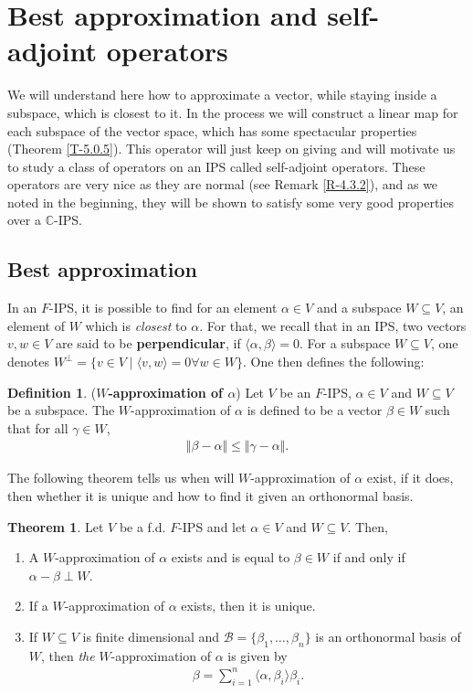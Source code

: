 \documentclass[letterpaper,11pt,twoside]{article}
\theoremstyle{definition}
\theoremstyle{definition}
\newtheorem{definition}[proposition]{Definition}
\newtheorem{theorem}[proposition]{Theorem}
\theoremstyle{definition}
\theoremstyle{definition}
\theoremstyle{definition}
\theoremstyle{definition}
\theoremstyle{remark}
\theoremstyle{definition}
\newcommand{\ip}[2]{\langle #1,#2 \rangle}
\newcommand{\norm}[1]{\Vert #1 \Vert}
\newcommand{\C}{\mathbb{C}}
\begin{document}
    \section{Best approximation and self-adjoint operators}
    We will understand here how to approximate a vector, while staying inside a subspace, which is closest to it. In the process we will construct a linear map for each subspace of the vector space, which has some spectacular properties (Theorem \ref{T-5.0.5}). This operator will just keep on giving and will motivate us to study a class of operators on an IPS called self-adjoint operators. These operators are very nice as they are normal (see Remark \ref{R-4.3.2}), and as we noted in the beginning, they will be shown to satisfy some very good properties over a $ \C $-IPS.
    \subsection{Best approximation}
    In an $ F $-IPS, it is possible to find for an element $ \alpha\in V $ and a subspace $ W\subseteq V $, an element of $ W $ which is \textit{closest} to $ \alpha $. For that, we recall that in an IPS, two vectors $ v,w\in V$ are said to be \textbf{perpendicular}, if $ \ip{\alpha}{\beta} = 0 $. For a subspace $ W\subseteq V $, one denotes $ W^{\perp} = \{v\in V\;\vert\; \ip{v}{w} = 0 \forall w\in W \} $. One then defines the following:
    \begin{definition}
    	(\textbf{$ W $-approximation of $ \alpha $}) Let $ V $ be an $ F$-IPS, $ \alpha \in V $ and $ W\subseteq V $ be a subspace. The $ W $-approximation of $ \alpha $ is defined to be a vector $ \beta \in W $ such that for all $ \gamma \in W $, 
    	\begin{align*}
    		\norm{\beta -\alpha} \le \norm{\gamma - \alpha}.
    	\end{align*}
    \end{definition}
     The following theorem tells us when will $ W $-approximation of $ \alpha $ exist, if it does, then whether it is unique and how to find it given an orthonormal basis.
     \begin{theorem}\label{T-5.0.2}
     	Let $ V $ be a f.d. $ F $-IPS and let $ \alpha \in V $ and $ W\subseteq V $. Then, 
     	\begin{enumerate}
     		\item {A $ W $-approximation of $ \alpha $ exists and is equal to $ \beta\in W $ if and only if $ \alpha -\beta\perp W $.}
     		\item {If a $ W $-approximation of $ \alpha $ exists, then it is unique.}
     		\item {If $ W \subseteq V$ is finite dimensional and $ \mathcal{B} = \{\beta_1,\dots,\beta_n\} $ is an orthonormal basis of $ W $, then \textit{the} $ W $-approximation of $ \alpha $ is given by
     	\begin{align*}
     		\beta = \sum_{i=1}^{n}\ip{\alpha}{\beta_i}\beta_i.
     	\end{align*}	
     	}
     	\end{enumerate}
     \end{theorem}
\end{document}
